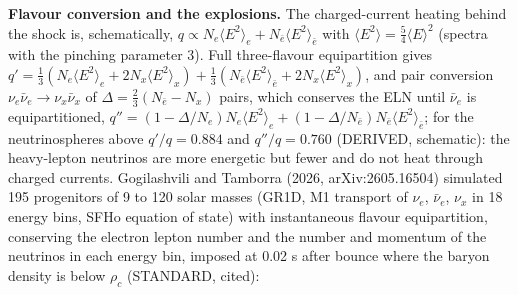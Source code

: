 \documentclass[
  10pt,
]{article}
\begin{document}
\textbf{Flavour conversion and the explosions.} The charged-current
heating behind the shock is, schematically,
\(q \propto N_e\langle E^2\rangle_e + N_{\bar e}\langle E^2\rangle_{\bar e}\)
with \(\langle E^2\rangle = \frac54\langle E\rangle^2\) (spectra with
the pinching parameter 3). Full three-flavour equipartition gives
\(q' = \frac13(N_e\langle E^2\rangle_e + 2N_x\langle E^2\rangle_x) + \frac13(N_{\bar e}\langle E^2\rangle_{\bar e} + 2N_x\langle E^2\rangle_x)\),
and pair conversion \(\nu_e\bar\nu_e \to \nu_x\bar\nu_x\) of
\(\Delta = \frac23(N_{\bar e} - N_x)\) pairs, which conserves the ELN
until \(\bar\nu_e\) is equipartitioned,
\(q'' = (1 - \Delta/N_e)N_e\langle E^2\rangle_e + (1 - \Delta/N_{\bar e})N_{\bar e}\langle E^2\rangle_{\bar e}\);
for the neutrinospheres above \(q'/q = 0.884\) and \(q''/q = 0.760\)
(DERIVED, schematic): the heavy-lepton neutrinos are more energetic but
fewer and do not heat through charged currents. Gogilashvili and
Tamborra (2026, arXiv:2605.16504) simulated 195 progenitors of 9 to 120
solar masses (GR1D, M1 transport of \(\nu_e\), \(\bar\nu_e\), \(\nu_x\)
in 18 energy bins, SFHo equation of state) with instantaneous flavour
equipartition, conserving the electron lepton number and the number and
momentum of the neutrinos in each energy bin, imposed at 0.02 s after
bounce where the baryon density is below \(\rho_c\) (STANDARD, cited):
\end{document}
